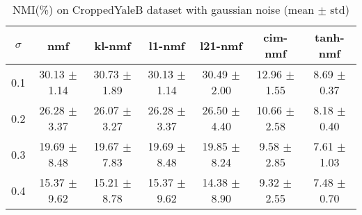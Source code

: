 \documentclass{article} %
\begin{document}
\begin{table}
\begin{tabular}{c|cccccc}$\sigma$ & nmf & kl-nmf & l1-nmf & l21-nmf & cim-nmf & tanh-nmf \\\hline
0.1 & 30.13 $\pm$ 1.14 & 30.73 $\pm$ 1.89 & 30.13 $\pm$ 1.14 & 30.49 $\pm$ 2.00 & 12.96 $\pm$ 1.55 & 8.69 $\pm$ 0.37 \\
0.2 & 26.28 $\pm$ 3.37 & 26.07 $\pm$ 3.27 & 26.28 $\pm$ 3.37 & 26.50 $\pm$ 4.40 & 10.66 $\pm$ 2.58 & 8.18 $\pm$ 0.40 \\
0.3 & 19.69 $\pm$ 8.48 & 19.67 $\pm$ 7.83 & 19.69 $\pm$ 8.48 & 19.85 $\pm$ 8.24 & 9.58 $\pm$ 2.85 & 7.61 $\pm$ 1.03 \\
0.4 & 15.37 $\pm$ 9.62 & 15.21 $\pm$ 8.78 & 15.37 $\pm$ 9.62 & 14.38 $\pm$ 8.90 & 9.32 $\pm$ 2.55 & 7.48 $\pm$ 0.70 \\
\end{tabular}\caption{
  NMI(\%) on CroppedYaleB dataset with gaussian noise (mean $\pm$ std)
  \label{tab:NMI-CroppedYaleB-gaussian}
}\end{table}
\end{document}
